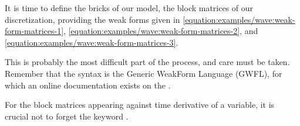\documentclass[letterpaper,10pt,english]{sphinxmanual}
\begin{document}
\begin{sphinxVerbatim}[commandchars=\\\{\}]
  \PYG{p}{[}
        
        
\PYG{p}{]}

   
\end{sphinxVerbatim}

\sphinxAtStartPar
It is time to define the bricks of our model,  the block matrices
of our discretization, providing the weak forms given in
\eqref{equation:examples/wave:weak-form-matrices-1}, \eqref{equation:examples/wave:weak-form-matrices-2}, and
\eqref{equation:examples/wave:weak-form-matrices-3}.

\sphinxAtStartPar
This is probably the most difficult part of the process, and care must
be taken. Remember that the syntax is the Generic Weak\sphinxhyphen{}Form Language
(GWFL), for which an on\sphinxhyphen{}line documentation exists on the .

\sphinxAtStartPar
For the block matrices appearing against time derivative of a variable,
it is crucial not to forget the keyword .
\end{document}
